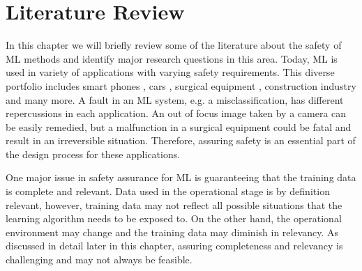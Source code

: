 \chapter{Literature Review}
\label{chap:literature}

In this chapter we will briefly review some of the literature about the safety of ML methods and identify major research questions in this area. 
Today, ML is used in variety of applications with varying safety requirements. This diverse portfolio includes smart phones \cite{smartphone2012}, cars \cite{Levinson2011}, surgical equipment \cite{Egert2020}, construction industry \cite{bilal2020} and many more. A fault in an ML system, e.g. a misclassification, has different repercussions in each application. An out of focus image taken by a camera can be easily remedied, but a malfunction in a surgical equipment could be fatal and result in an irreversible situation. Therefore, assuring safety is an essential part of the design process for these applications.

One major issue in safety assurance for ML is guaranteeing that the training data is complete and relevant. Data used in the operational stage is by definition relevant, however, training data may not reflect all possible situations that the learning algorithm needs to be exposed to. On the other hand, the operational environment may change and the training data may diminish in relevancy. As discussed in detail later in this chapter, assuring completeness and relevancy is challenging and may not always be feasible. 

